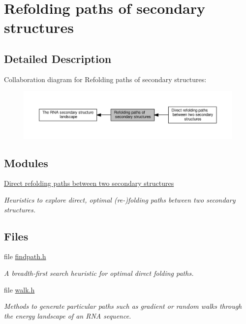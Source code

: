 \hypertarget{group__paths}{}\section{Refolding paths of secondary structures}
\label{group__paths}


\subsection{Detailed Description}
Collaboration diagram for Refolding paths of secondary structures\+:
\nopagebreak
\begin{figure}[H]
\begin{center}
\leavevmode
\includegraphics[width=350pt]{group__paths}
\end{center}
\end{figure}
\subsection*{Modules}
\begin{DoxyCompactItemize}
\item 
\hyperlink{group__direct__paths}{Direct refolding paths between two secondary structures}
\begin{DoxyCompactList}\small\item\em Heuristics to explore direct, optimal (re-\/)folding paths between two secondary structures. \end{DoxyCompactList}\end{DoxyCompactItemize}
\subsection*{Files}
\begin{DoxyCompactItemize}
\item 
file \hyperlink{findpath_8h}{findpath.\+h}
\begin{DoxyCompactList}\small\item\em A breadth-\/first search heuristic for optimal direct folding paths. \end{DoxyCompactList}\item 
file \hyperlink{walk_8h}{walk.\+h}
\begin{DoxyCompactList}\small\item\em Methods to generate particular paths such as gradient or random walks through the energy landscape of an R\+NA sequence. \end{DoxyCompactList}\end{DoxyCompactItemize}
